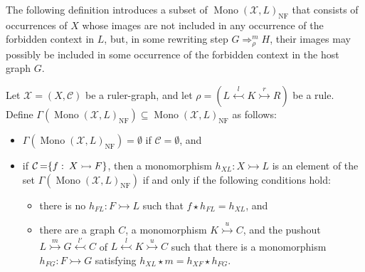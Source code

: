  The following definition introduces a subset of $\operatorname{Mono}(\mathcal{X},L)_{\operatorname{NF}}$ that consists of occurrences of $X$ whose images are not included in any occurrence of the forbidden context in $L$,
    but, in some rewriting step $G \mathop{\Rightarrow}_\rho^m H$, their images may possibly be included in some occurrence of the forbidden context in the host graph $G$.
\begin{definition}
    \label{antipattern:def:gamma_l_rho_x}
    Let $\mathcal{X}=(X,\mathcal{C})$ be a ruler-graph, and let \( \rho \mathop{=} (L \overset{l}{\leftarrowtail} K \overset{r}{\rightarrowtail} R) \) be a rule.
    Define $\Gamma(\operatorname{Mono}(\mathcal{X},L)_{\operatorname{NF}})\subseteq \operatorname{Mono}(\mathcal{X},L)_{\operatorname{NF}}$ as follows:
    \begin{itemize}
        \item $\Gamma(\operatorname{Mono}(\mathcal{X},L)_{\operatorname{NF}}) \mathop{=} \emptyset$ if $\mathcal{C} \mathop{=} \emptyset$, and
        \item if $\mathcal{C} \mathop{=} \{f\mathop{\colon}X \rightarrowtail F\}$, then a monomorphism $h_{XL} \mathop{\colon} X \rightarrowtail L$ is an element of the set $\Gamma(\operatorname{Mono}(\mathcal{X},L)_{\operatorname{NF}})$ if and only if the following conditions hold:
            \begin{itemize}
                \item there is no $h_{FL}:F \rightarrowtail L$ such that $f \mathop{\star} h_{FL} \mathop{=} h_{XL}$, and
                \item  
                there are a graph $C$, a monomorphism $K \overset{u}{\rightarrowtail} C$, and the pushout $L \overset{m}{\rightarrowtail} G \overset{l'}{\leftarrowtail} C$ of $L \overset{l}{\leftarrowtail} K \overset{u}{\rightarrowtail} C$ such that
                there is a monomorphism $h_{FG} \mathop{\colon} F \rightarrowtail G$ satisfying
                $h_{XL} \mathop{\star} m \mathop{=} h_{XF} \mathop{\star} h_{FG}$. 
            \begin{center}
\end{center}
\end{itemize}
\end{itemize}
\end{definition}
